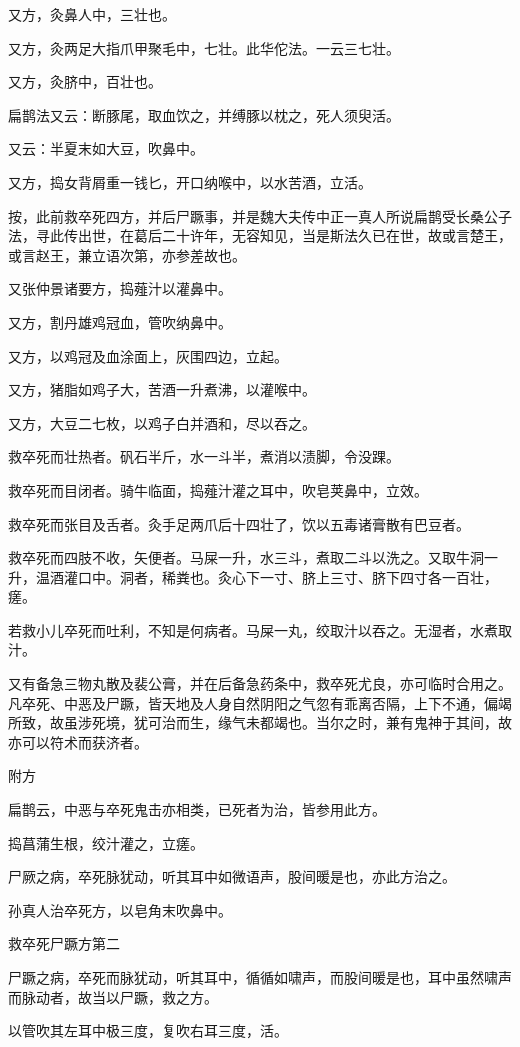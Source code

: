 \documentclass[12pt,UTF8]{ctexbook}
\begin{document}
又方，灸鼻人中，三壮也。

又方，灸两足大指爪甲聚毛中，七壮。此华佗法。一云三七壮。

又方，灸脐中，百壮也。

扁鹊法又云：断豚尾，取血饮之，并缚豚以枕之，死人须臾活。

又云：半夏末如大豆，吹鼻中。

又方，捣女背屑重一钱匕，开口纳喉中，以水苦酒，立活。

按，此前救卒死四方，并后尸蹶事，并是魏大夫传中正一真人所说扁鹊受长桑公子法，寻此传出世，在葛后二十许年，无容知见，当是斯法久已在世，故或言楚王，或言赵王，兼立语次第，亦参差故也。

又张仲景诸要方，捣薤汁以灌鼻中。

又方，割丹雄鸡冠血，管吹纳鼻中。

又方，以鸡冠及血涂面上，灰围四边，立起。

又方，猪脂如鸡子大，苦酒一升煮沸，以灌喉中。

又方，大豆二七枚，以鸡子白并酒和，尽以吞之。

救卒死而壮热者。矾石半斤，水一斗半，煮消以渍脚，令没踝。

救卒死而目闭者。骑牛临面，捣薤汁灌之耳中，吹皂荚鼻中，立效。

救卒死而张目及舌者。灸手足两爪后十四壮了，饮以五毒诸膏散有巴豆者。

救卒死而四肢不收，矢便者。马屎一升，水三斗，煮取二斗以洗之。又取牛洞一升，温酒灌口中。洞者，稀粪也。灸心下一寸、脐上三寸、脐下四寸各一百壮，瘥。

若救小儿卒死而吐利，不知是何病者。马屎一丸，绞取汁以吞之。无湿者，水煮取汁。

又有备急三物丸散及裴公膏，并在后备急药条中，救卒死尤良，亦可临时合用之。凡卒死、中恶及尸蹶，皆天地及人身自然阴阳之气忽有乖离否隔，上下不通，偏竭所致，故虽涉死境，犹可治而生，缘气未都竭也。当尔之时，兼有鬼神于其间，故亦可以符术而获济者。

附方

扁鹊云，中恶与卒死鬼击亦相类，已死者为治，皆参用此方。

捣菖蒲生根，绞汁灌之，立瘥。

尸厥之病，卒死脉犹动，听其耳中如微语声，股间暖是也，亦此方治之。

孙真人治卒死方，以皂角末吹鼻中。

救卒死尸蹶方第二

尸蹶之病，卒死而脉犹动，听其耳中，循循如啸声，而股间暖是也，耳中虽然啸声而脉动者，故当以尸蹶，救之方。

以管吹其左耳中极三度，复吹右耳三度，活。
\end{document}
